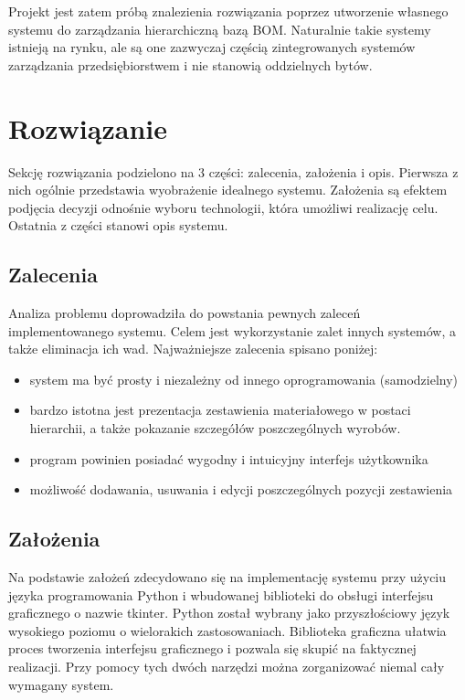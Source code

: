 \documentclass[12pt,twoside]{article}
\begin{document}
Projekt jest zatem próbą znalezienia rozwiązania poprzez utworzenie własnego systemu do zarządzania hierarchiczną bazą BOM. Naturalnie takie systemy istnieją na rynku, ale są one zazwyczaj częścią zintegrowanych systemów zarządzania przedsiębiorstwem i nie stanowią oddzielnych bytów.

\clearpage
\section{Rozwiązanie}

Sekcję rozwiązania podzielono na 3 części: zalecenia, założenia i opis. Pierwsza z nich ogólnie przedstawia wyobrażenie idealnego systemu. Założenia są efektem podjęcia decyzji odnośnie wyboru technologii, która umożliwi realizację celu. Ostatnia z części stanowi opis systemu.

\subsection*{Zalecenia}
Analiza problemu doprowadziła do powstania pewnych zaleceń implementowanego systemu. Celem jest wykorzystanie zalet innych systemów, a także eliminacja ich wad. Najważniejsze zalecenia spisano poniżej:

\begin{itemize}[label=-,labelsep=0.4cm,leftmargin=0.6cm]
\item system ma być prosty i niezależny od innego oprogramowania (samodzielny)
\item bardzo istotna jest prezentacja zestawienia materiałowego w postaci hierarchii, a także pokazanie szczegółów poszczególnych wyrobów. 
\item program powinien posiadać wygodny i intuicyjny interfejs użytkownika
\item możliwość dodawania, usuwania i edycji poszczególnych pozycji zestawienia
\end{itemize}

\subsection*{Założenia}
Na podstawie założeń zdecydowano się na implementację systemu przy użyciu języka programowania Python i wbudowanej biblioteki do obsługi interfejsu graficznego o nazwie tkinter. Python został wybrany jako  przyszłościowy język wysokiego poziomu o wielorakich zastosowaniach. Biblioteka graficzna ułatwia proces tworzenia interfejsu graficznego i pozwala się skupić na faktycznej realizacji. Przy pomocy tych dwóch narzędzi można zorganizować niemal cały wymagany system.
\end{document}
